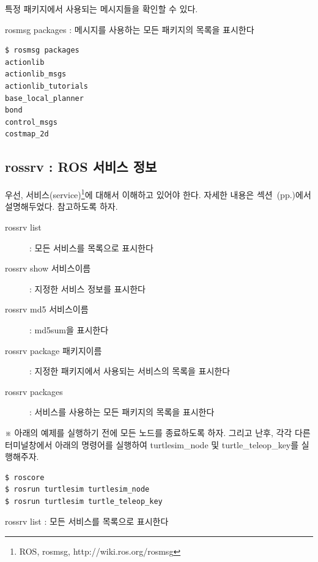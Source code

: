 \noindent
특정 패키지에서 사용되는 메시지들을 확인할 수 있다.

\vspace{\baselineskip}
\noindent
{}\circled{\thenum} rosmsg packages : 메시지를 사용하는 모든 패키지의 목록을 표시한다

\begin{lstlisting}[language=ROS]
$ rosmsg packages
actionlib
actionlib_msgs
actionlib_tutorials
base_local_planner
bond
control_msgs
costmap_2d
\end{lstlisting}

\subsection{rossrv : ROS 서비스 정보}

우선, 서비스(service)\footnote{ROS, rosmsg, http://wiki.ros.org/rosmsg}에 대해서 이해하고 있어야 한다. 자세한 내용은 섹션~(pp.\pageref{def:RosService})에서 설명해두었다. 참고하도록 하자.

\vspace{\baselineskip}
\noindent
\begin{description}
\item[rossrv list] : 모든 서비스를 목록으로 표시한다
\item[rossrv show 서비스이름] : 지정한 서비스 정보를 표시한다
\item[rossrv md5 서비스이름] : md5sum을 표시한다
\item[rossrv package 패키지이름] : 지정한 패키지에서 사용되는 서비스의 목록을 표시한다
\item[rossrv packages] : 서비스를 사용하는 모든 패키지의 목록을 표시한다
\end{description}

\vspace{\baselineskip}
\noindent
※ 아래의 예제를 실행하기 전에 모든 노드를 종료하도록 하자. 그리고 난후, 각각 다른 터미널창에서 아래의 명령어를 실행하여 turtlesim\_node 및 turtle\_teleop\_key를 실행해주자.

\begin{lstlisting}[language=ROS]
$ roscore
$ rosrun turtlesim turtlesim_node 
$ rosrun turtlesim turtle_teleop_key
\end{lstlisting}

\setcounter{num}{0}

\vspace{\baselineskip}
\noindent
{}\circled{\thenum} rossrv list : 모든 서비스를 목록으로 표시한다

